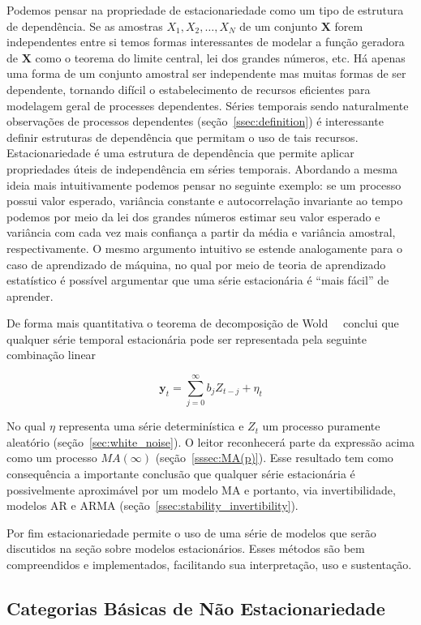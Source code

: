 Podemos pensar na propriedade de estacionariedade como um tipo de estrutura de
dependência. Se as amostras $X_1, X_2, \dots, X_N$ de um conjunto $\mathbf{X}$
forem independentes entre si temos formas interessantes de modelar a função
geradora de $\mathbf{X}$ como o teorema do limite central, lei dos grandes
números, etc. Há apenas uma forma de um conjunto amostral ser independente mas
muitas formas de ser dependente, tornando difícil o estabelecimento de recursos
eficientes para modelagem geral de processes dependentes. Séries temporais
sendo naturalmente observações de processos dependentes
(seção~\ref{ssec:definition}) é interessante definir estruturas de dependência
que permitam o uso de tais recursos. Estacionariedade é uma estrutura de
dependência que permite aplicar propriedades úteis de independência em séries
temporais. Abordando a mesma ideia mais intuitivamente podemos pensar no
seguinte exemplo: se um processo possui valor esperado, variância constante e
autocorrelação invariante ao tempo podemos por meio da lei dos grandes números
estimar seu valor esperado e variância com cada vez mais confiança a partir da
média e variância amostral, respectivamente. O mesmo argumento intuitivo se
estende
analogamente para o caso de aprendizado de máquina, no qual por meio de teoria
de aprendizado estatístico é possível argumentar que uma série estacionária é
``mais fácil'' de aprender.

De forma mais quantitativa o teorema de decomposição de Wold~~\cite{chatfield}
conclui que qualquer série temporal estacionária pode ser representada pela
seguinte combinação linear

$$\mathbf{y}_t = \sum_{j=0}^\infty b_j Z_{t-j} + \eta_t$$

No qual $\eta$ representa uma série determinística e $Z_t$ um processo
puramente aleatório (seção~\ref{sec:white_noise}). O leitor reconhecerá parte
da expressão acima como um processo $MA(\infty)$ (seção~\ref{sssec:MA(p)}).
Esse resultado tem como consequência a importante conclusão que qualquer série
estacionária é possivelmente aproximável por um modelo MA e portanto, via
invertibilidade, modelos AR e ARMA (seção~\ref{ssec:stability_invertibility}).

Por fim estacionariedade permite o uso de uma série de modelos que serão
discutidos na seção sobre modelos estacionários. Esses métodos são bem
compreendidos e implementados, facilitando sua interpretação, uso e
sustentação.

\subsection{Categorias Básicas de Não Estacionariedade}\label{ssec:taxonomy}

